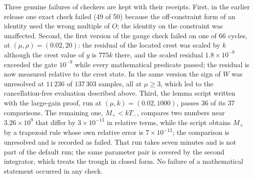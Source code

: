 Three genuine failures of checkers are kept with their receipts. First, in the earlier release one exact check failed (49 of 50) because the off-constraint form of an identity used the wrong multiple of $O$; the identity on the constraint was unaffected. Second, the first version of the gauge check failed on one of 66 cycles, at $(\mu,\rho)=(0.02,20)$: the residual of the located crest was scaled by $k$ although the crest value of $y$ is $775k$ there, and the scaled residual $1.8\times10^{-9}$ exceeded the gate $10^{-9}$ while every mathematical predicate passed; the residual is now measured relative to the crest state. In the same version the sign of $W$ was unresolved at $11\,236$ of $137\,303$ samples, all at $\mu\ge3$, which led to the cancellation-free evaluation described above. Third, the lemma script written with the large-gain proof, run at $(\mu,k)=(0.02,1000)$, passes 36 of its 37 comparisons. The remaining one, $M_+<kT_-$, compares two numbers near $3.26\times10^{9}$ that differ by $3\times10^{-13}$ in relative terms, while the script obtains $M_+$ by a trapezoid rule whose own relative error is $7\times10^{-12}$; the comparison is unresolved and is recorded as failed. That run takes seven minutes and is not part of the default run; the same parameter pair is covered by the second integrator, which treats the trough in closed form. No failure of a mathematical statement occurred in any check.

